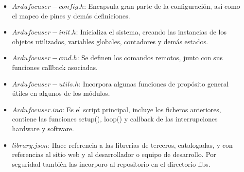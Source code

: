 \begin{itemize}
	
\item $Ardufocuser-config.h$: Encapsula gran parte de la configuración, así como el mapeo de pines y demás definiciones. 
\item $Ardufocuser-init.h$: Inicializa el sistema, creando las instancias de los objetos utilizados, variables globales, contadores y demás estados.
\item $Ardufocuser-cmd.h$: Se definen los comandos remotos, junto con sus funciones callback asociadas.
\item $Ardufocuser-utils.h$: Incorpora algunas funciones de propósito general útiles en algunos de los módulos. 
\item $Ardufocuser.ino$: Es el script principal, incluye los ficheros anteriores, contiene las funciones setup(),  loop() y callback de las interrupciones hardware y software.

\item $library.json$: Hace referencia a las librerías de terceros, catalogadas, y con referencias al sitio web y al desarrollador o equipo de desarrollo. Por seguridad también las incorporo al repositorio en el directorio libs.  


\end{itemize}
\newpage
